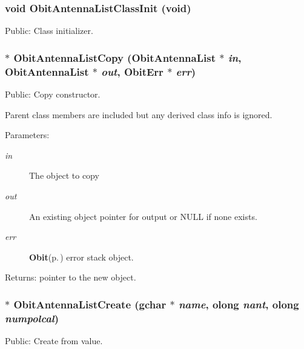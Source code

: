 \subsubsection{\setlength{\rightskip}{0pt plus 5cm}void Obit\-Antenna\-List\-Class\-Init (void)}\label{ObitAntennaList_8h_a9}


Public: Class initializer. 

\subsubsection{$\ast$ Obit\-Antenna\-List\-Copy ({\bf Obit\-Antenna\-List} $\ast$ {\em in}, {\bf Obit\-Antenna\-List} $\ast$ {\em out}, {\bf Obit\-Err} $\ast$ {\em err})}\label{ObitAntennaList_8h_a12}


Public: Copy constructor. 

Parent class members are included but any derived class info is ignored. \begin{Desc}
\item[Parameters:]
\begin{description}
\item[{\em in}]The object to copy \item[{\em out}]An existing object pointer for output or NULL if none exists. \item[{\em err}]{\bf Obit}{\rm (p.\,\pageref{structObit})} error stack object. \end{description}
\end{Desc}
\begin{Desc}
\item[Returns:]pointer to the new object. \end{Desc}
\subsubsection{$\ast$ Obit\-Antenna\-List\-Create (gchar $\ast$ {\em name}, {\bf olong} {\em nant}, {\bf olong} {\em numpolcal})}\label{ObitAntennaList_8h_a13}


Public: Create from value. 

